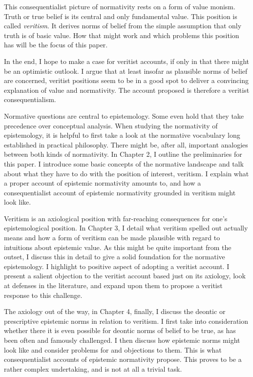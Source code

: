 \documentclass[12pt,numbers=noenddot]{scrartcl}
\begin{document}
This consequentialist picture of normativity rests on a form of value monism. Truth or true belief is its central and only fundamental value. This position is called \emph{veritism}. It derives norms of belief from the simple assumption that only truth is of basic value. How that might work and which problems this position has will be the focus of this paper.

In the end, I hope to make a case for veritist accounts, if only in that there might be an optimistic outlook. I argue that at least insofar as plausible norms of belief are concerned, veritist positions seem to be in a good spot to deliver a convincing explanation of value and normativity. The account proposed is therefore a veritist consequentialism.

Normative questions are central to epistemology. Some even hold that they take precedence over conceptual analysis. When studying the normativity of epistemology, it is helpful to first take a look at the normative vocabulary long established in practical philosophy. There might be, after all, important analogies between both kinds of normativity. In Chapter 2, I outline the preliminaries for this paper. I introduce some basic concepts of the normative landscape and talk about what they have to do with the position of interest, veritism. I explain what a proper account of epistemic normativity amounts to, and how a consequentialist account of epistemic normativity grounded in veritism might look like.

Veritism is an axiological position with far-reaching consequences for one's epistemological position. In Chapter 3, I detail what veritism spelled out actually means and how a form of veritism can be made plausible with regard to intuitions about epistemic value. As this might be quite important from the outset, I discuss this in detail to give a solid foundation for the normative epistemology. I highlight to positive aspect of adopting a veritist account. I present a salient objection to the veritist account based just on its axiology, look at defenses in the literature, and expand upon them to propose a veritist response to this challenge.

The axiology out of the way, in Chapter 4, finally, I discuss the deontic or prescriptive epistemic norms in relation to veritism. I first take into consideration whether there it is even possible for deontic norms of belief to be true, as has been often and famously challenged. I then discuss how epistemic norms might look like and consider problems for and objections to them. This is what consequentialist accounts of epistemic normativity propose. This proves to be a rather complex undertaking, and is not at all a trivial task.
\end{document}

